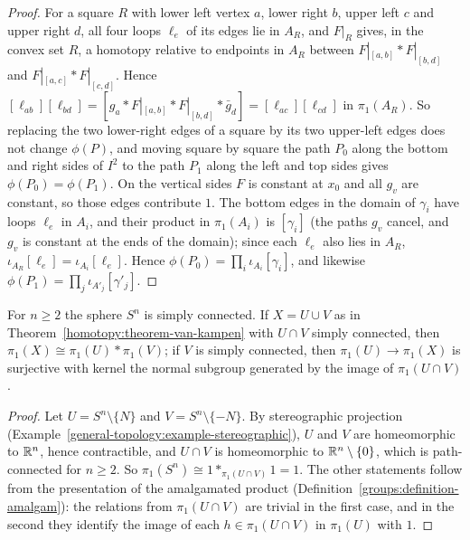 \begin{proof}
For a square $R$ with lower left vertex $a$, lower right $b$, upper left $c$ and upper right $d$, all four loops $\ell_e$ of its edges lie in $A_R$, and
$F|_R$ gives, in the convex set $R$, a homotopy relative to endpoints in $A_R$ between $F|_{[a,b]} * F|_{[b,d]}$ and $F|_{[a,c]} * F|_{[c,d]}$. Hence
$[\ell_{ab}][\ell_{bd}] = [g_a * F|_{[a,b]} * F|_{[b,d]} * \bar g_d] = [\ell_{ac}][\ell_{cd}]$ in $\pi_1(A_R)$. So replacing the two lower-right edges of a square
by its two upper-left edges does not change $\phi(P)$, and moving square by square the path $P_0$ along the bottom and right sides of $I^2$ to the path $P_1$ along
the left and top sides gives $\phi(P_0) = \phi(P_1)$. On the vertical sides $F$ is constant at $x_0$ and all $g_v$ are constant, so those edges contribute
$1$. The bottom edges in the domain of $\gamma_i$ have loops $\ell_e$ in $A_i$, and their product in $\pi_1(A_i)$ is $[\gamma_i]$ (the paths $g_v$ cancel, and
$g_v$ is constant at the ends of the domain); since each $\ell_e$ also lies in $A_R$, $\iota_{A_R}[\ell_e] = \iota_{A_i}[\ell_e]$. Hence
$\phi(P_0) = \prod_i \iota_{A_i}[\gamma_i]$, and likewise $\phi(P_1) = \prod_j \iota_{A'_j}[\gamma'_j]$.
\end{proof}

\begin{corollary}\label{homotopy:corollary-spheres}
For $n \geq 2$ the sphere $S^n$ is simply connected. If $X = U \cup V$ as in Theorem~\ref{homotopy:theorem-van-kampen} with $U \cap V$ simply connected, then
$\pi_1(X) \cong \pi_1(U) * \pi_1(V)$; if $V$ is simply connected, then $\pi_1(U) \to \pi_1(X)$ is surjective with kernel the normal subgroup generated by the
image of $\pi_1(U \cap V)$.
\end{corollary}

\begin{proof}
Let $U = S^n \setminus \{N\}$ and $V = S^n \setminus \{-N\}$. By stereographic projection (Example~\ref{general-topology:example-stereographic}), $U$ and $V$ are
homeomorphic to $\mathbb{R}^n$, hence contractible, and $U \cap V$ is homeomorphic to $\mathbb{R}^n \setminus \{0\}$, which is path-connected for $n \geq 2$. So
$\pi_1(S^n) \cong 1 *_{\pi_1(U \cap V)} 1 = 1$. The other statements follow from the presentation of the amalgamated product
(Definition~\ref{groups:definition-amalgam}): the relations from $\pi_1(U \cap V)$ are trivial in the first case, and in the second they identify the image of
each $h \in \pi_1(U \cap V)$ in $\pi_1(U)$ with $1$.
\end{proof}

